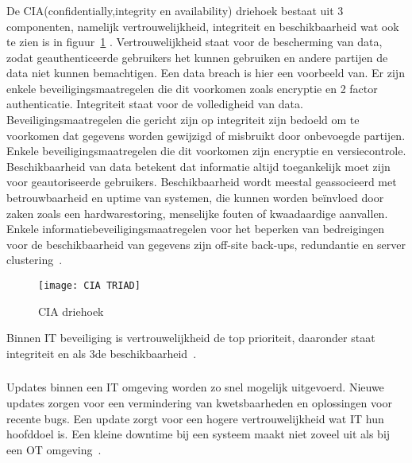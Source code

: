 \subsubsection{}
\label{subsec:CIA driehoek}
De CIA(confidentially,integrity en availability) driehoek bestaat uit 3 componenten, namelijk vertrouwelijkheid, integriteit en beschikbaarheid wat ook te zien is in figuur~\ref{fig:2.4} . Vertrouwelijkheid staat voor de bescherming van data, zodat geauthenticeerde gebruikers het kunnen gebruiken en andere partijen de data niet kunnen bemachtigen. Een data breach is hier een voorbeeld van. Er zijn enkele beveiligingsmaatregelen die dit voorkomen zoals encryptie en 2 factor authenticatie. Integriteit staat voor de volledigheid van data. Beveiligingsmaatregelen die gericht zijn op integriteit zijn bedoeld om te voorkomen dat gegevens worden gewijzigd of misbruikt door onbevoegde partijen. Enkele beveiligingsmaatregelen die dit voorkomen zijn encryptie en versiecontrole. Beschikbaarheid van data betekent dat informatie altijd toegankelijk moet zijn voor geautoriseerde gebruikers. Beschikbaarheid wordt meestal geassocieerd met betrouwbaarheid en uptime van systemen, die kunnen worden beïnvloed door zaken zoals een hardwarestoring, menselijke fouten of kwaadaardige aanvallen. Enkele informatiebeveiligingsmaatregelen voor het beperken van bedreigingen voor de beschikbaarheid van gegevens zijn off-site back-ups, redundantie en server clustering~\autocite{Debbie2019}. 
\begin{figure}
    \texttt{[image: CIA TRIAD]}
    \caption{CIA driehoek\autocite{Debbie2019} \label{fig:2.4}} 
    
\end{figure}
 
 Binnen IT beveiliging is vertrouwelijkheid de top prioriteit, daaronder staat integriteit en als 3de beschikbaarheid~\autocite{Max2020}.
 
\subsubsection{}
\label{subsec:Updates IT}
Updates binnen een IT omgeving worden zo snel mogelijk uitgevoerd. Nieuwe updates zorgen voor een vermindering van kwetsbaarheden en oplossingen voor recente bugs. Een update zorgt voor een hogere vertrouwelijkheid wat IT hun hoofddoel is. Een kleine downtime bij een systeem maakt niet zoveel uit als bij een OT omgeving~\autocite{Max2020}. 
